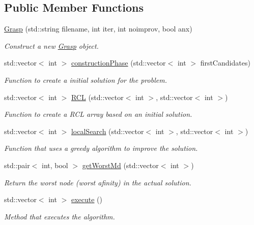 \subsection*{Public Member Functions}
\begin{DoxyCompactItemize}
\item 
\hyperlink{classGrasp_acf9e8029b833f71283be24a9309c5cad}{Grasp} (std\+::string filename, int iter, int noimprov, bool anx)
\begin{DoxyCompactList}\small\item\em Construct a new \hyperlink{classGrasp}{Grasp} object. \end{DoxyCompactList}\item 
std\+::vector$<$ int $>$ \hyperlink{classGrasp_aef091e71dd747ebcb78e1ebcdcf44221}{construction\+Phase} (std\+::vector$<$ int $>$ first\+Candidates)
\begin{DoxyCompactList}\small\item\em Function to create a initial solution for the problem. \end{DoxyCompactList}\item 
std\+::vector$<$ int $>$ \hyperlink{classGrasp_ac63d4a1892472663549c77686edfed74}{R\+CL} (std\+::vector$<$ int $>$, std\+::vector$<$ int $>$)
\begin{DoxyCompactList}\small\item\em Function to create a R\+CL array based on an initial solution. \end{DoxyCompactList}\item 
std\+::vector$<$ int $>$ \hyperlink{classGrasp_a7c5bebb4a0dea342928f66fb73a56559}{local\+Search} (std\+::vector$<$ int $>$, std\+::vector$<$ int $>$)
\begin{DoxyCompactList}\small\item\em Function that uses a greedy algorithm to improve the solution. \end{DoxyCompactList}\item 
std\+::pair$<$ int, bool $>$ \hyperlink{classGrasp_a858a5aee4066bf5ef7946e8ea3e10bcf}{get\+Worst\+Md} (std\+::vector$<$ int $>$)
\begin{DoxyCompactList}\small\item\em Return the worst node (worst afinity) in the actual solution. \end{DoxyCompactList}\item 
std\+::vector$<$ int $>$ \hyperlink{classGrasp_a335b063bccd26b434dda3a3a69d6d711}{execute} ()
\begin{DoxyCompactList}\small\item\em Method that executes the algorithm. \end{DoxyCompactList}\end{DoxyCompactItemize}
